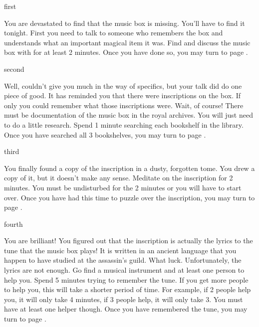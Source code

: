 \documentclass[greennotebook]{NeptuneBall}
\begin{document}

\startnotebook{\nGazaStrip{}}

\begin{page}{first}

You are devastated to find that the music box is missing. You'll have to find it tonight. First you need to talk to someone who remembers the box and understands what an important magical item it was. Find \cManta{} and discuss the music box with \cManta{\them} for at least 2 minutes. Once you have done so, you may turn to page .

\end{page}

\begin{page}{second}

Well, \cManta{} couldn't give you much in the way of specifics, but your talk did do one piece of good. It has reminded you that there were inscriptions on the box. If only you could remember what those inscriptions were. Wait, of course! There must be documentation of the music box in the royal archives. You will just need to do a little research. Spend 1 minute searching each bookshelf in the library. Once you have searched all 3 bookshelves, you may turn to page .

\end{page}

\begin{page}{third}

You finally found a copy of the inscription in a dusty, forgotten tome. You drew a copy of it, but it doesn't make any sense. Meditate on the inscription for 2 minutes. You must be undisturbed for the 2 minutes or you will have to start over. Once you have had this time to puzzle over the inscription, you may turn to page .

\end{page}

\begin{page}{fourth}

You are brilliant! You figured out that the inscription is actually the lyrics to the tune that the music box plays! It is written in an ancient language that you happen to have studied at the assassin's guild. What luck. Unfortunately, the lyrics are not enough. Go find a musical instrument and at least one person to help you. Spend 5 minutes trying to remember the tune. If you get more people to help you, this will take a shorter period of time. For example, if 2 people help you, it will only take 4 minutes, if 3 people help, it will only take 3. You must have at least one helper though. Once you have remembered the tune, you may turn to page .

\end{page}
\end{document}
